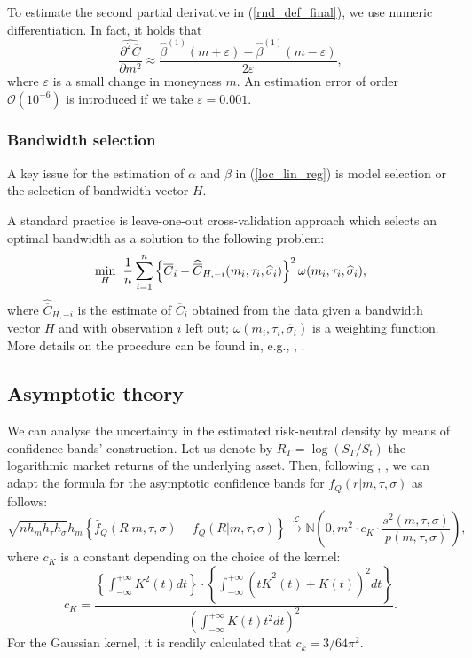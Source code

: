 \documentclass[a4paper,12pt]{article}
\theoremstyle{plain}
\theoremstyle{definition}
\begin{document}
To estimate the second partial derivative in (\ref{rnd_def_final}), we use numeric differentiation. In fact, it holds that
\begin{equation}
\widehat{\frac{ \partial^2 \overline{C} }{\partial m^2}} \approx \frac{ \widehat{\beta}^{(1)}(m + \varepsilon) - \widehat{\beta}^{(1)}(m - \varepsilon) }{2 \varepsilon},
\end{equation}
where $\varepsilon$ is a small change in moneyness $m$. An estimation error of order $\mathcal{O}(10^{-6})$ is introduced if we take $\varepsilon = 0.001$.

\subsubsection{Bandwidth selection}
A key issue for the estimation of $\alpha$ and $\beta$ in (\ref{loc_lin_reg}) is model selection or the selection of bandwidth vector $H$.

A standard practice is leave-one-out cross-validation approach which selects an optimal bandwidth as a solution to the following problem:
\begin{equation}
\underset{H}{\min} \hspace{2mm} \frac{1}{n} \sum_{i=1}^n \left\{ \overline{C}_i - \widehat{\overline{C}}_{H, -i}(m_i, \tau_i, \widehat{\sigma}_i) \right\}^2 \omega (m_i, \tau_i, \widehat{\sigma}_i),
\label{loc_lin_reg}
\end{equation}
where $\widehat{\overline{C}}_{H, -i}$ is the estimate of $\overline{C}_i$ obtained from the data given a bandwidth vector $H$ and with observation $i$ left out; $\omega (m_i, \tau_i, \widehat{\sigma}_i)$ is a weighting function. More details on the procedure can be found in, e.g., \cite{hastie_et_al}, \citet{haerdle_et_al}.

\subsection{Asymptotic theory}
We can analyse the uncertainty in the estimated risk-neutral density by means of confidence bands' construction. Let us denote by $R_T = \log(S_T/S_t)$ the logarithmic market returns of the underlying asset. Then, following \citet{ait_sahalia_lo_1}, \citet{song_xiu}, we can adapt the formula for the asymptotic confidence bands for $f_Q(r | m, \tau, \sigma)$ as follows:
\begin{equation}
\sqrt{n h_{m} h_{\tau} h_{\sigma}} h_{m} \left\{ \widehat{f}_Q(R | m, \tau, \sigma) - f_Q(R | m, \tau, \sigma) \right\} \stackrel{\mathcal{L}}{\rightarrow} \mathbb{N}\left( 0, m^2 \cdot c_K \cdot \frac{s^2(m, \tau, \sigma)}{p(m, \tau, \sigma)} \right),
\end{equation}
where $c_K$ is a constant depending on the choice of the kernel:
\begin{equation}
c_K = \frac{ \left\{ \int_{- \infty}^{+ \infty}K^2(t)dt \right\} \cdot \left\{ \int_{- \infty}^{+ \infty} \left( t \dot{K}^2(t)  + K(t) \right)^2 dt \right\} }{\left( \int_{- \infty}^{+ \infty} K(t) t^2 dt \right)^2}.
\end{equation}
For the Gaussian kernel, it is readily calculated that $c_k = 3/64 \pi^2$.
\end{document}
